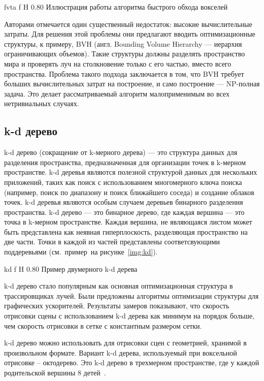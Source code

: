    {fvta}
    {f}
    {H}
    {0.80\textwidth}
    {Иллюстрация работы алгоритма быстрого обхода вокселей~\cite{AFVTAfRT}}

Авторами отмечается один существенный недостаток: высокие вычислительные затраты. Для решения
этой проблемы они предлагают вводить оптимизационные структуры, к примеру, BVH 
(англ. Bounding Volume Hierarchy --- иерархия ограничивающих объемов). 
Такие структуры должны разделять пространство мира
и проверять луч на столкновение только с его частью, вместо всего пространства. Проблема такого 
подхода заключается в том, что BVH требует больших вычислительных затрат на построение, и
само построение --- NP-полная задача. Это делает рассматриваемый алгоритм малоприменимым во 
всех нетривиальных случаях.

\subsection{k-d дерево}

k-d дерево (сокращение от k-мерного дерева) --- это структура данных 
для разделения пространства, предназначенная для организации точек в 
k-мерном пространстве. k-d деревья являются полезной структурой данных 
для нескольких приложений, таких как поиск с использованием многомерного 
ключа поиска (например, поиск по диапазону и поиск ближайшего соседа) и 
создание облаков точек. k-d деревья являются особым случаем деревьев 
бинарного разделения пространства. k-d дерево --- это бинарное дерево, где каждая 
вершина --- это точка в k-мерном пространстве. Каждая вершина, не являющаяся листом 
может быть представлена как неявная гиперплоскость, разделяющая пространство на две части.
Точки в каждой из частей представлены соответсвующими поддеревьями (см.~пример~на
рисунке~\ref{img:kd}).

    {kd}
    {f}
    {H}
    {0.80\textwidth}
    {Пример двумерного k-d дерева~\cite{KDtree}}

k-d дерево стало популярным как основная оптимизационная структура в 
трассировщиках лучей. Были предложены алгоритмы оптимизации структуры для графических
ускорителей. Результаты замеров показывают, что скорость отрисовки сцены с использованием
k-d дерева как минимум на порядок больше, чем скорость отрисовки в сетке с константным 
размером сетки.

k-d дерево можно использовать для отрисовки сцен с геометрией, хранимой в произвольном 
формате. Вариант k-d дерева, используемый при воксельной отрисовке -- октодерево. Это k-d дерево в трехмерном пространстве, где у каждой родительской вершины 8 детей~\cite{KDTASfaGR}.

